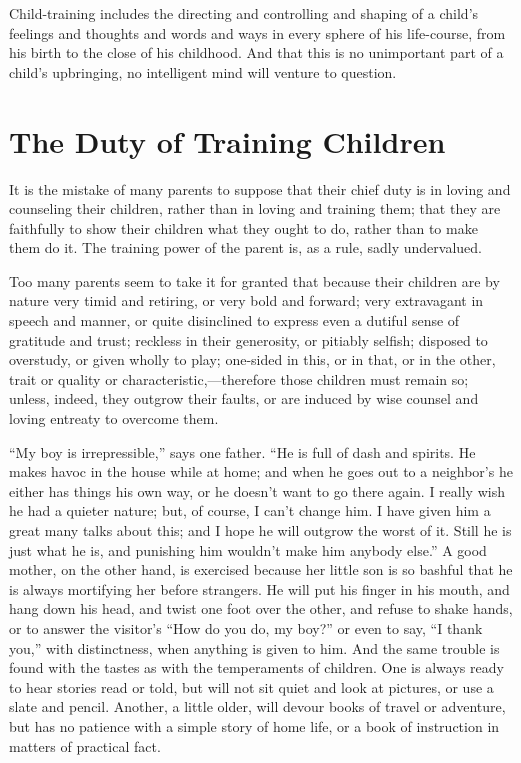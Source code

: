 \documentclass[
]{book}
\begin{document}
Child-training includes the directing and controlling and shaping of a child's feelings and thoughts and words and ways in every sphere of his life-course, from his birth to the close of his childhood. And that this is no unimportant part of a child's upbringing, no intelligent mind will venture to question.

\hypertarget{the-duty-of-training-children}{%
\chapter{The Duty of Training Children}\label{the-duty-of-training-children}}

It is the mistake of many parents to suppose that their chief duty is in loving and counseling their children, rather than in loving and training them; that they are faithfully to show their children what they ought to do, rather than to make them do it. The training power of the parent is, as a rule, sadly undervalued.

Too many parents seem to take it for granted that because their children are by nature very timid and retiring, or very bold and forward; very extravagant in speech and manner, or quite disinclined to express even a dutiful sense of gratitude and trust; reckless in their generosity, or pitiably selfish; disposed to overstudy, or given wholly to play; one-sided in this, or in that, or in the other, trait or quality or characteristic,---therefore those children must remain so; unless, indeed, they outgrow their faults, or are induced by wise counsel and loving entreaty to overcome them.

``My boy is irrepressible,'' says one father. ``He is full of dash and spirits. He makes havoc in the house while at home; and when he goes out to a neighbor's he either has things his own way, or he doesn't want to go there again. I really wish he had a quieter nature; but, of course, I can't change him. I have given him a great many talks about this; and I hope he will outgrow the worst of it. Still he is just what he is, and punishing him wouldn't make him anybody else.'' A good mother, on the other hand, is exercised because her little son is so bashful that he is always mortifying her before strangers. He will put his finger in his mouth, and hang down his head, and twist one foot over the other, and refuse to shake hands, or to answer the visitor's ``How do you do, my boy?'' or even to say, ``I thank you,'' with distinctness, when anything is given to him. And the same trouble is found with the tastes as with the temperaments of children. One is always ready to hear stories read or told, but will not sit quiet and look at pictures, or use a slate and pencil. Another, a little older, will devour books of travel or adventure, but has no patience with a simple story of home life, or a book of instruction in matters of practical fact.
\end{document}
